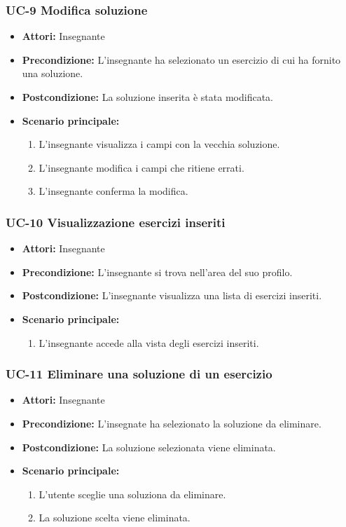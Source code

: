 \subsubsection{UC-9 Modifica soluzione}
\begin{itemize}
\item \textbf{Attori: }Insegnante
\item \textbf{Precondizione: }L'insegnante ha selezionato un esercizio di cui ha fornito una soluzione.
\item \textbf{Postcondizione: }La soluzione inserita è stata modificata.
\item \textbf{Scenario principale: }
		\begin{enumerate}
		\item L'insegnante visualizza i campi con la vecchia soluzione.
		\item L'insegnante modifica i campi che ritiene errati.
		\item L'insegnante conferma la modifica.
		\end{enumerate}
\end{itemize}

\subsubsection{UC-10 Visualizzazione esercizi inseriti}
\begin{itemize}
\item \textbf{Attori: }Insegnante
		\item \textbf{Precondizione: }L'insegnante si trova nell'area del suo profilo.
		\item \textbf{Postcondizione: }L'insegnante visualizza una lista di esercizi inseriti. 
		\item \textbf{Scenario principale: }
		\begin{enumerate}
		\item L'insegnante accede alla vista degli esercizi inseriti.
		\end{enumerate}
	\end{itemize}
	
\subsubsection{UC-11 Eliminare una soluzione di un esercizio}
\begin{itemize}
\item \textbf{Attori: }Insegnante
		\item \textbf{Precondizione: }L'insegnate ha selezionato la soluzione da eliminare.
		\item \textbf{Postcondizione: }La soluzione selezionata viene eliminata. 
		\item \textbf{Scenario principale: }
		\begin{enumerate}
		\item L'utente sceglie una soluziona da eliminare.
		\item La soluzione scelta viene eliminata.
		\end{enumerate}
	\end{itemize}

